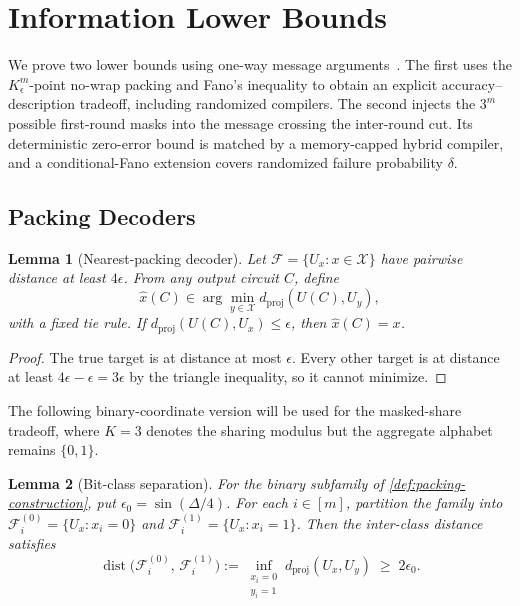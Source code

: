 \documentclass[a4paper,twocolumn,10pt,unpublished]{quantumarticle}
\newtheorem{lemma}{Lemma}
\begin{document}
\section{Information Lower Bounds}
\label{sec:reduction}

We prove two lower bounds using one-way message arguments~\cite{kushilevitz1997communication}.
The first uses the $K_\epsilon^m$-point no-wrap packing and Fano's inequality
to obtain an explicit accuracy--description tradeoff, including randomized
compilers.  The second injects the $3^m$ possible first-round masks into the
message crossing the inter-round cut.  Its deterministic zero-error bound is
matched by a memory-capped hybrid compiler, and a conditional-Fano extension
covers randomized failure probability $\delta$.

\subsection{Packing Decoders}

\begin{lemma}[Nearest-packing decoder]
\label{lem:nearest-decoder}
Let $\mathcal F=\{U_x:x\in\mathcal X\}$ have pairwise distance at least
$4\epsilon$.  From any output circuit $C$, define
\begin{equation*}
 \widehat x(C)\in\arg\min_{y\in\mathcal X}
       d_{\mathrm{proj}}(U(C),U_y),
\end{equation*}
with a fixed tie rule.  If
$d_{\mathrm{proj}}(U(C),U_x)\leq\epsilon$, then $\widehat x(C)=x$.
\end{lemma}

\begin{proof}
The true target is at distance at most $\epsilon$.  Every other target is
at distance at least $4\epsilon-\epsilon=3\epsilon$ by the triangle
inequality, so it cannot minimize.
\end{proof}

The following binary-coordinate version will be used for the masked-share
tradeoff, where $K=3$ denotes the sharing modulus but the aggregate alphabet
remains $\{0,1\}$.

\begin{lemma}[Bit-class separation]
\label{lem:bit-class-separation}
For the binary subfamily of \cref{def:packing-construction}, put
$\epsilon_0=\sin(\Delta/4)$.  For each $i \in [m]$, partition the family into
$\mathcal{F}_i^{(0)} = \{U_x : x_i = 0\}$ and
$\mathcal{F}_i^{(1)} = \{U_x : x_i = 1\}$. Then the inter-class distance
satisfies
\begin{equation}\label{eq:bit-class-sep}
\operatorname{dist}\!\bigl(\mathcal{F}_i^{(0)},\,\mathcal{F}_i^{(1)}\bigr)
:= \inf_{\substack{x_i=0 \\ y_i=1}} d_{\mathrm{proj}}(U_x, U_y)
\;\geq\; 2\epsilon_0.
\end{equation}
\end{lemma}
\end{document}
